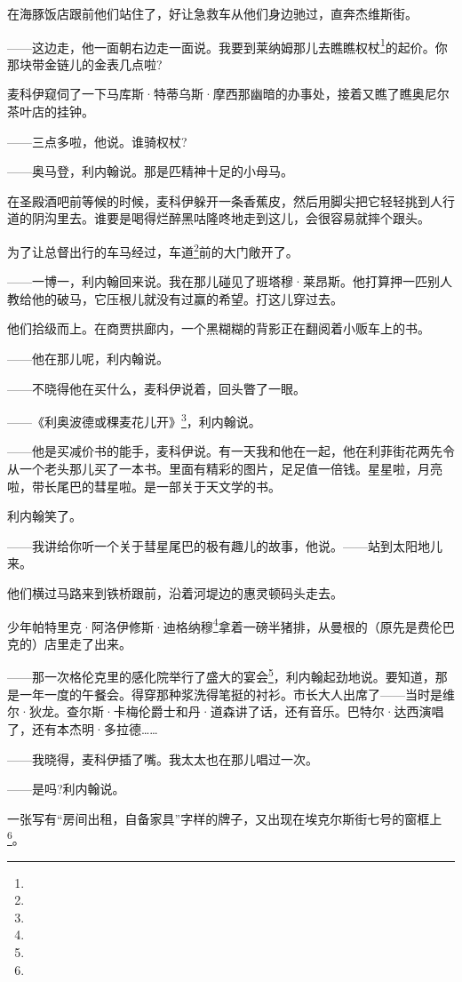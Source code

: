 \par 在海豚饭店跟前他们站住了，好让急救车从他们身边驰过，直奔杰维斯街。
\par ——这边走，他一面朝右边走一面说。我要到莱纳姆那儿去瞧瞧权杖\footnote{}的起价。你那块带金链儿的金表几点啦?
\par 麦科伊窥伺了一下马库斯·特蒂乌斯·摩西那幽暗的办事处，接着又瞧了瞧奥尼尔茶叶店的挂钟。
\par ——三点多啦，他说。谁骑权杖?
\par ——奥马登，利内翰说。那是匹精神十足的小母马。
\par 在圣殿酒吧前等候的时候，麦科伊躲开一条香蕉皮，然后用脚尖把它轻轻挑到人行道的阴沟里去。谁要是喝得烂醉黑咕隆咚地走到这儿，会很容易就摔个跟头。
\par 为了让总督出行的车马经过，车道\footnote{}前的大门敞开了。
\par ——一博一，利内翰回来说。我在那儿碰见了班塔穆·莱昂斯。他打算押一匹别人教给他的破马，它压根儿就没有过赢的希望。打这儿穿过去。
\par 他们拾级而上。在商贾拱廊内，一个黑糊糊的背影正在翻阅着小贩车上的书。
\par ——他在那儿呢，利内翰说。
\par ——不晓得他在买什么，麦科伊说着，回头瞥了一眼。
\par ——《利奥波德或稞麦花儿开》\footnote{}，利内翰说。
\par ——他是买减价书的能手，麦科伊说。有一天我和他在一起，他在利菲街花两先令从一个老头那儿买了一本书。里面有精彩的图片，足足值一倍钱。星星啦，月亮啦，带长尾巴的彗星啦。是一部关于天文学的书。
\par 利内翰笑了。
\par ——我讲给你听一个关于彗星尾巴的极有趣儿的故事，他说。——站到太阳地儿来。
\par 他们横过马路来到铁桥跟前，沿着河堤边的惠灵顿码头走去。
\par 少年帕特里克·阿洛伊修斯·迪格纳穆\footnote{}拿着一磅半猪排，从曼根的（原先是费伦巴克的）店里走了出来。
\par ——那一次格伦克里的感化院举行了盛大的宴会\footnote{}，利内翰起劲地说。要知道，那是一年一度的午餐会。得穿那种浆洗得笔挺的衬衫。市长大人出席了——当时是维尔·狄龙。查尔斯·卡梅伦爵士和丹·道森讲了话，还有音乐。巴特尔·达西演唱了，还有本杰明·多拉德……
\par ——我晓得，麦科伊插了嘴。我太太也在那儿唱过一次。
\par ——是吗?利内翰说。
\par 一张写有“房间出租，自备家具”字样的牌子，又出现在埃克尔斯街七号的窗框上\footnote{}。
